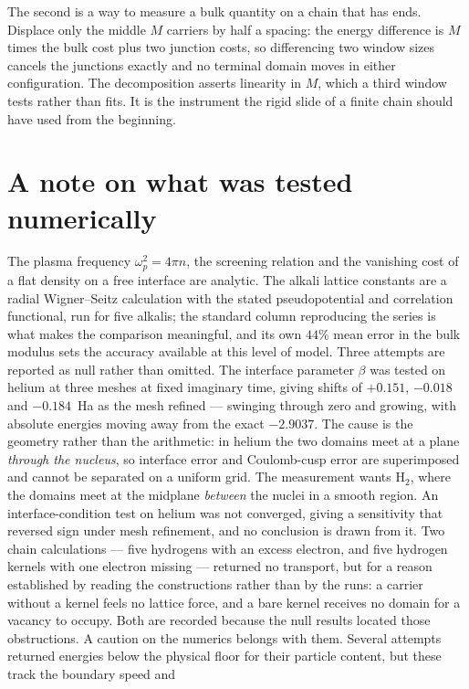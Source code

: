 \documentclass[11pt]{article}
\begin{document}
The second is a way to measure a bulk quantity on a chain that has ends. Displace only the middle $M$
carriers by half a spacing: the energy difference is $M$ times the bulk cost plus two junction costs,
so differencing two window sizes cancels the junctions exactly and no terminal domain moves in either
configuration. The decomposition asserts linearity in $M$, which a third window tests rather than
fits. It is the instrument the rigid slide of a finite chain should have used from the beginning.

\section*{A note on what was tested numerically}

The plasma frequency $\omega_p^2=4\pi n$, the screening relation and the vanishing cost of a flat
density on a free interface are analytic. The alkali lattice constants are a radial Wigner--Seitz
calculation with the stated pseudopotential and correlation functional, run for five alkalis; the
standard column reproducing the
series is what makes the comparison meaningful, and its own $44\%$ mean error in the bulk modulus
sets the accuracy available at this level of model. Three attempts are reported as null rather than omitted. The interface parameter
$\beta$ was tested on helium at three meshes at fixed imaginary time, giving shifts of $+0.151$,
$-0.018$ and $-0.184$~Ha as the mesh refined --- swinging through zero and growing, with absolute
energies moving away from the exact $-2.9037$. The cause is the geometry rather than the arithmetic:
in helium the two domains meet at a plane \emph{through the nucleus}, so interface error and
Coulomb-cusp error are superimposed and cannot be separated on a uniform grid. The measurement wants
$\mathrm{H_2}$, where the domains meet at the midplane \emph{between} the nuclei in a smooth
region. An interface-condition test on helium was
not converged, giving a sensitivity that reversed sign under mesh refinement, and no conclusion is
drawn from it. Two chain calculations --- five hydrogens with an excess electron, and five hydrogen
kernels with one electron missing --- returned no transport, but for a reason established by reading
the constructions rather than by the runs: a carrier without a kernel feels no lattice force, and a
bare kernel receives no domain for a vacancy to occupy. Both are recorded because the null results
located those obstructions. A caution on the numerics belongs with them. Several attempts returned
energies below the physical floor for their particle content, but these track the boundary speed and
\end{document}
